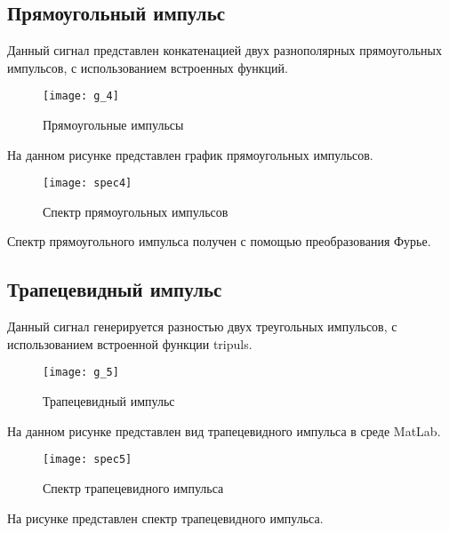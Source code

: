 \subsection{Прямоугольный импульс}


\parindent=1cm
Данный сигнал представлен конкатенацией двух разнополярных прямоугольных импульсов, с использованием встроенных функций.

\begin{figure}[H]
	\begin{center}
		\texttt{[image: g\_4]}
		\caption{Прямоугольные импульсы} 
		\label{pic:g_4} %
	\end{center}
\end{figure}
На данном рисунке представлен график прямоугольных импульсов.

\begin{figure}[H]
	\begin{center}
		\texttt{[image: spec4]}
		\caption{Спектр прямоугольных импульсов} 
		\label{pic:spec4} %
	\end{center}
\end{figure}
Спектр прямоугольного импульса получен с помощью преобразования Фурье.

\subsection{Трапецевидный импульс}


\parindent=1cm
Данный сигнал генерируется разностью двух треугольных импульсов, с использованием встроенной функции tripuls.

\begin{figure}[H]
	\begin{center}
		\texttt{[image: g\_5]}
		\caption{Трапецевидный импульс} 
		\label{pic:g_5} %
	\end{center}
\end{figure}
На данном рисунке представлен вид трапецевидного импульса в среде MatLab.

\begin{figure}[H]
	\begin{center}
		\texttt{[image: spec5]}
		\caption{Спектр трапецевидного импульса} 
		\label{pic:spec5} %
	\end{center}
\end{figure}
На рисунке представлен спектр трапецевидного импульса.


